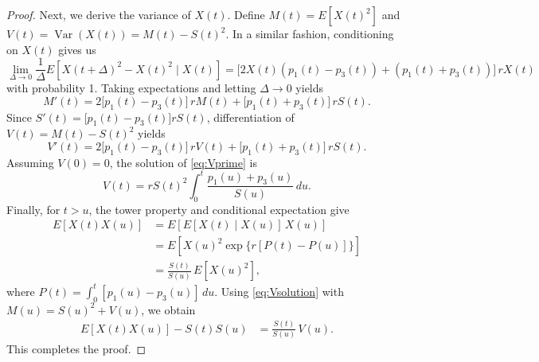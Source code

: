 \documentclass[pdflatex,sn-mathphys-num]{sn-jnl}
\theoremstyle{thmstyleone}%
\theoremstyle{thmstyletwo}%
\theoremstyle{thmstylethree}%
\begin{document}
\begin{proof}
Next, we derive the variance of $X(t)$. Define $M(t)=E[X(t)^2]$ and $V(t)=\operatorname{Var}(X(t))=M(t)-S(t)^2$.
In a similar fashion, conditioning on $X(t)$ gives us
\begin{equation}
\label{eq:increment_second}
\lim_{\Delta\to 0}\frac{1}{\Delta}E\!\left[X(t+\Delta)^2-X(t)^2\mid X(t)\right]=\bigl[2X(t)(p_1(t)-p_3(t))+(p_1(t)+p_3(t))\bigr]\,rX(t)
\end{equation}
with probability 1. Taking expectations and letting $\Delta\to 0$ yields
\begin{equation}
\label{eq:Mprime}
M'(t)
=2\bigl[p_1(t)-p_3(t)\bigr]\,rM(t)
+\bigl[p_1(t)+p_3(t)\bigr]\,rS(t).
\end{equation}
Since $S'(t)=\bigl[p_1(t)-p_3(t)\bigr]rS(t)$, differentiation of
$V(t)=M(t)-S(t)^2$ yields
\begin{equation}
\label{eq:Vprime}
V'(t)
=2\bigl[p_1(t)-p_3(t)\bigr]\,rV(t)
+\bigl[p_1(t)+p_3(t)\bigr]\,rS(t).
\end{equation}
Assuming $V(0)=0$, the solution of \eqref{eq:Vprime} is
\begin{equation}
\label{eq:Vsolution}
V(t)
=rS(t)^2\int_0^t \frac{p_1(u)+p_3(u)}{S(u)}\,du.
\end{equation}
Finally, for $t>u$, the tower property and conditional expectation give
\begin{equation}
\begin{split}
E[X(t)X(u)]
&=E\!\left[E[X(t)\mid X(u)]\,X(u)\right] \\
&=E\!\left[X(u)^2 \exp\{r[P(t)-P(u)]\}\right] \\
&=\frac{S(t)}{S(u)}\,E[X(u)^2],
\end{split}
\end{equation}
where $P(t)=\int_0^t[p_1(u)-p_3(u)]\,du$.
Using \eqref{eq:Vsolution} with $M(u)=S(u)^2+V(u)$, we obtain
\begin{equation}
\begin{split}
E[X(t)X(u)]-S(t)S(u)
&=\frac{S(t)}{S(u)}\,V(u).
\end{split}
\end{equation}
This completes the proof.
\end{proof}
\end{document}
